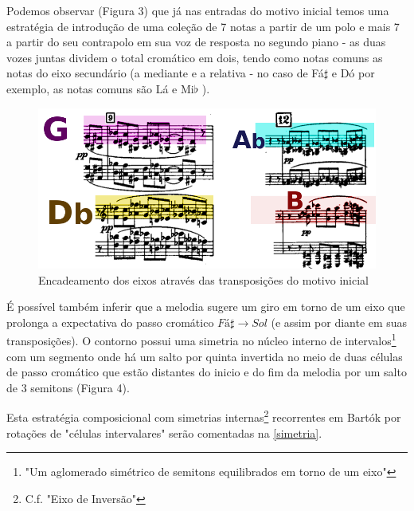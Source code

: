 \documentclass[
	12pt,				%
	openright,			%
	twoside,			%
	a4paper,			%
	english,			%
	french,				%
	spanish,			%
	brazil				%
	]{abntex2}
\begin{document}
Podemos observar (Figura 3) que já nas entradas do motivo inicial temos uma estratégia de introdução de uma coleção de 7 notas a partir de um polo e mais 7 a partir do seu contrapolo em sua voz de resposta no segundo piano - as duas vozes juntas dividem o total cromático em dois, tendo como notas comuns as notas do eixo secundário (a mediante e a relativa - no caso de Fá$\sharp$ e Dó por exemplo, as notas comuns são Lá e Mi$\flat$ ).

\begin{figure}[!h]
	\caption{\label{fig_grafico}Encadeamento dos eixos através das transposições do motivo inicial }
	\begin{center}
	    \includegraphics[scale=0.35]{axis/sonata2pianos_mm9-12.png}
	\end{center}
\end{figure}



É possível também inferir que a melodia sugere um giro em torno de um eixo que prolonga a expectativa do passo cromático $Fá\sharp \rightarrow Sol$ (e assim por diante em suas transposições). O contorno possui uma simetria no núcleo interno de intervalos\footnote{"Um aglomerado simétrico de semitons equilibrados em torno de um eixo"\cite[p. 120]{straus2004}} com um segmento onde há um salto por quinta invertida no meio de duas células de passo cromático que estão distantes do inicio e do fim da melodia por um salto de 3 semitons (Figura 4). 

Esta estratégia composicional com simetrias internas\footnote{C.f. "Eixo de Inversão"\cite[p. 121]{straus2004}} recorrentes em Bartók por rotações de "células intervalares"\cite[p. 128]{susanni_antokoletz2012music} serão comentadas na \autoref{simetria}.
\end{document}
